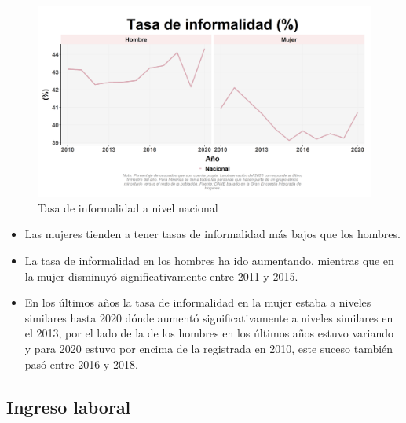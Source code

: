     \begin{figure}[H]
        \caption{Tasa de informalidad a nivel nacional \label{map_result_2} }
        \begin{center}
        \includegraphics[width=\textwidth,keepaspectratio]{img/var_69_trend.png}
        \end{center}
    \end{figure}
            \begin{itemize}
                \item Las mujeres tienden a tener tasas de informalidad más bajos que los hombres.
                \item La tasa de informalidad en los hombres ha ido aumentando, mientras que en la mujer disminuyó significativamente entre 2011 y 2015.
                \item En los últimos años la tasa de informalidad en la mujer estaba a niveles similares hasta 2020 dónde aumentó significativamente a niveles similares en el 2013, por el lado de la de los hombres en los últimos años estuvo variando y para 2020 estuvo por encima de la registrada en 2010, este suceso también pasó entre 2016 y 2018.
                \end{itemize}

    \subsection{Ingreso laboral}


